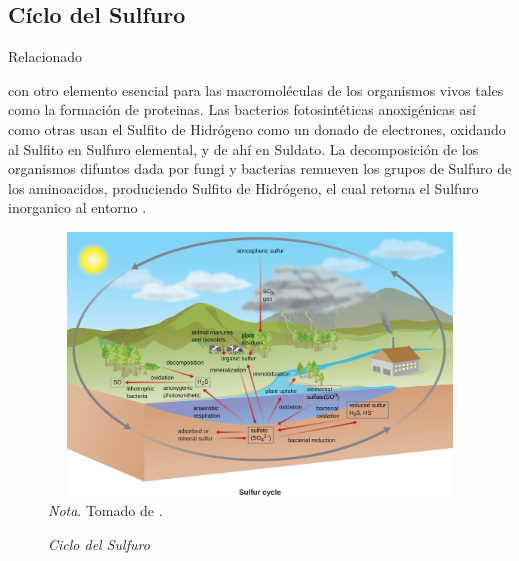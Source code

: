 \documentclass[stu, 12pt, letterpaper, donotrepeattitle, floatsintext, natbib]{apa7}
\begin{document}
\subsection{Cíclo del Sulfuro}
Relacionado \begin{justifying}
    con otro elemento esencial para las macromoléculas de los organismos vivos tales como la formación de proteinas.
    Las bacterios fotosintéticas anoxigénicas así como otras usan el Sulfito de Hidrógeno como un donado de electrones, oxidando al Sulfito en Sulfuro elemental, y de ahí en Suldato. La decomposición de los organismos difuntos dada por fungi y bacterias remueven los grupos de Sulfuro
    de los aminoacidos, produciendo Sulfito de Hidrógeno, el cual retorna el Sulfuro inorganico al entorno \citep{openstax-no-date}.\par
\end{justifying}
\vspace{\baselineskip}
\begin{figure}[H]
    \caption{\emph{Ciclo del Sulfuro}}
    \centering
    \includegraphics[width=14cm,height=7cm]{sulfato.jpg}
    \bigskip
    \\\small\textit{Nota}. Tomado de \cite{openstax-no-date}. %
\end{figure}
\end{document}
